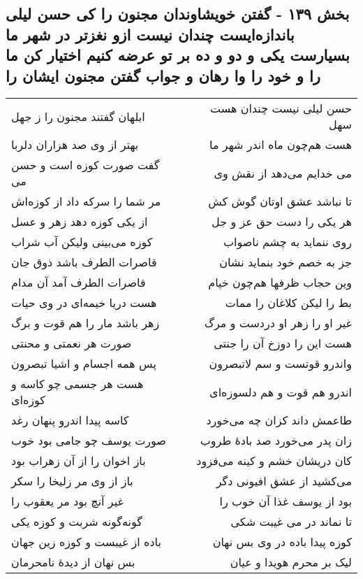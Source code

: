 \begin{center}
\section*{بخش ۱۳۹ - گفتن خویشاوندان مجنون را کی حسن لیلی باندازه‌ایست چندان نیست ازو نغزتر در شهر ما بسیارست یکی و دو و ده بر تو عرضه کنیم اختیار کن ما را و خود را وا رهان و جواب گفتن مجنون ایشان را}
\label{sec:sh139}
\begin{longtable}{l p{0.5cm} r}
ابلهان گفتند مجنون را ز جهل
&&
حسن لیلی نیست چندان هست سهل
\\
بهتر از وی صد هزاران دلربا
&&
هست هم‌چون ماه اندر شهر ما
\\
گفت صورت کوزه است و حسن می
&&
می خدایم می‌دهد از نقش وی
\\
مر شما را سرکه داد از کوزه‌اش
&&
تا نباشد عشق اوتان گوش کش
\\
از یکی کوزه دهد زهر و عسل
&&
هر یکی را دست حق عز و جل
\\
کوزه می‌بینی ولیکن آب شراب
&&
روی ننماید به چشم ناصواب
\\
قاصرات الطرف باشد ذوق جان
&&
جز به خصم خود بنماید نشان
\\
قاصرات الطرف آمد آن مدام
&&
وین حجاب ظرفها هم‌چون خیام
\\
هست دریا خیمه‌ای در وی حیات
&&
بط را لیکن کلاغان را ممات
\\
زهر باشد مار را هم قوت و برگ
&&
غیر او را زهر او دردست و مرگ
\\
صورت هر نعمتی و محنتی
&&
هست این را دوزخ آن را جنتی
\\
پس همه اجسام و اشیا تبصرون
&&
واندرو قوتست و سم لاتبصرون
\\
هست هر جسمی چو کاسه و کوزه‌ای
&&
اندرو هم قوت و هم دلسوزه‌ای
\\
کاسه پیدا اندرو پنهان رغد
&&
طاعمش داند کزان چه می‌خورد
\\
صورت یوسف چو جامی بود خوب
&&
زان پدر می‌خورد صد بادهٔ طروب
\\
باز اخوان را از آن زهراب بود
&&
کان دریشان خشم و کینه می‌فزود
\\
باز از وی مر زلیخا را سکر
&&
می‌کشید از عشق افیونی دگر
\\
غیر آنچ بود مر یعقوب را
&&
بود از یوسف غذا آن خوب را
\\
گونه‌گونه شربت و کوزه یکی
&&
تا نماند در می غیبت شکی
\\
باده از غیبست و کوزه زین جهان
&&
کوزه پیدا باده در وی بس نهان
\\
بس نهان از دیدهٔ نامحرمان
&&
لیک بر محرم هویدا و عیان

\end{longtable}
\end{center}
